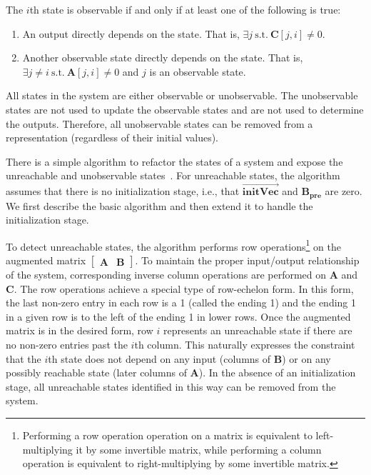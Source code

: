 The $i$th state is observable if and only if at least one of the
following is true:
\begin{enumerate}
\item \parbox[t]{2.8in}{An output directly depends on the state.  That
is, $\exists j~\mbox{s.t.}~\mathbf{C}[j,i] \ne 0$.}

\item \parbox[t]{2.8in}{Another observable state directly depends on
the state.  That is, $\exists j \ne i~\mbox{s.t.}~\mathbf{A}[j,i] \ne
0$ and $j$ is an observable state.}
\end{enumerate}
All states in the system are either observable or unobservable.  The
unobservable states are not used to update the observable states and
are not used to determine the outputs.  Therefore, all unobservable
states can be removed from a representation (regardless of their
initial values).

There is a simple algorithm to refactor the states of a system and
expose the unreachable and unobservable states~\cite{Mayne}.  For
unreachable states, the algorithm assumes that there is no
initialization stage, i.e., that $\overrightarrow{\mathbf{initVec}}$
and $\mathbf{B_{pre}}$ are zero.  We first describe the basic
algorithm and then extend it to handle the initialization stage.

To detect unreachable states, the algorithm performs row
operations\footnote{\smaller Performing a row operation operation on a
matrix is equivalent to left-multiplying it by some invertible matrix,
while performing a column operation is equivalent to right-multiplying
by some invertible matrix.} on the augmented matrix $\left [
\begin{array} {cc} \mathbf{A} & \mathbf{B} \end{array} \right ]$.  To 
maintain the proper input/output relationship of the system,
corresponding inverse column operations are performed on $\mathbf{A}$
and $\mathbf{C}$.  The row operations achieve a special type of
row-echelon form.  In this form, the last non-zero entry in each row
is a 1 (called the ending 1) and the ending 1 in a given row is to the
left of the ending 1 in lower rows.  Once the augmented matrix is in
the desired form, row $i$ represents an unreachable state if there are
no non-zero entries past the $i$th column.  This naturally expresses
the constraint that the $i$th state does not depend on any input
(columns of $\mathbf{B}$) or on any possibly reachable state (later
columns of $\mathbf{A}$).  In the absence of an initialization stage,
all unreachable states identified in this way can be removed from the
system.

